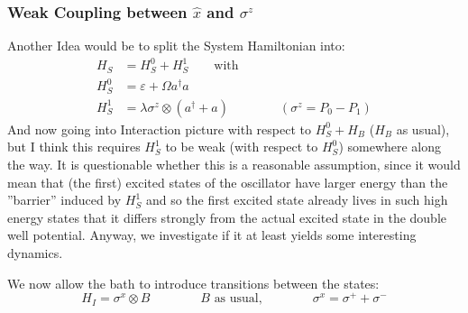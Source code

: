 	\subsubsection{Weak Coupling between $\hat{x}$ and $\sigma^z$}
	Another Idea would be to split the System Hamiltonian into:
	\begin{align*}
		H_S &= H_S^0 + H_S^1 \qquad \text{with} \\
		H_S^0 &=	\varepsilon + \Omega a^\dagger a \\
		H_S^1 &=	\lambda \sigma^z \otimes (a^\dagger + a) \qquad \qquad \left(\sigma^z = P_0 - P_1 \right)
	\end{align*}
	And now going into Interaction picture with respect to $H_S^0 + H_B$ ($H_B$ as usual), but I think this requires $H_S^1$ to be weak (with respect to $H_S^0$) somewhere along the way. It is questionable whether this is a reasonable assumption, since it would mean that (the first) excited states of the oscillator have larger energy than the ''barrier'' induced by $H_S^1$ and so the first excited state already lives in such high energy states that it differs strongly from the actual excited state in the double well potential. Anyway, we investigate if it at least yields some interesting dynamics.
	
	We now allow the bath to introduce transitions between the states:
	\begin{equation}
		H_I = \sigma^x \otimes B \qquad \qquad B\text{ as usual,} \qquad \qquad \sigma^x = \sigma^+ + \sigma^-
	\end{equation}
	
